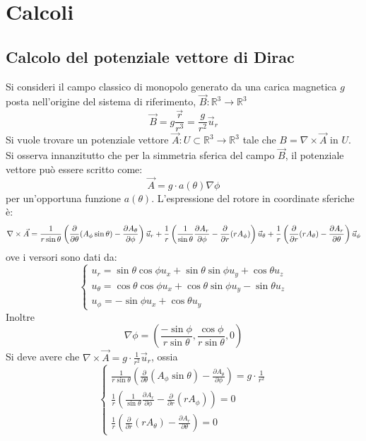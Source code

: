 \section{Calcoli}

\subsection{Calcolo del potenziale vettore di Dirac}
\label{sec:dirac_potential}
Si consideri il campo classico di monopolo generato da una carica magnetica $g$ posta
nell'origine del sistema di riferimento, $\vec B : \mathbb{R} ^3 \to \mathbb{R} ^3$
    $$ \vec B = g\frac{\vec r}{r^3} = \frac{g}{r^2} \vec u _r $$
Si vuole trovare un potenziale vettore $\vec A : U \subset \mathbb{R} ^3 \to \mathbb{R} ^3$ tale che
$ B = \nabla \times \vec A $ in $U$. Si osserva innanzitutto che per la simmetria
sferica del campo $\vec B$, il potenziale vettore può essere scritto come:
   $$ \vec A = g \cdot a(\theta) \nabla \phi $$
per un'opportuna funzione $a(\theta)$.
L'espressione del rotore in coordinate sferiche è:
$$
    \nabla \times \vec A =
         \frac{1}{r\sin\theta} \left(
              \frac{\partial}{\partial\theta}(A_\phi\sin\theta) -
              \frac{\partial A_\theta}{\partial\phi}
              \right) \vec u _r \\
         + \frac{1}{r} \left(
              \frac{1}{\sin\theta}\frac{\partial A_r}{\partial\phi} -
              \frac{\partial}{\partial r}(r A_\phi)
              \right)\vec u _\theta \\
         + \frac{1}{r} \left(
              \frac{\partial}{\partial r}(r A_\theta) - \frac{\partial A_r}{\partial\theta}
              \right)\vec u _\phi
$$
ove i versori sono dati da:
$$
\begin{cases}
    u_r = \sin\theta \cos\phi u_x + \sin\theta \sin\phi u_y + \cos\theta u_z\\
    u_\theta = \cos\theta \cos\phi u_x + \cos\theta \sin\phi u_y - \sin\theta u_z\\
    u_\phi = -\sin\phi u_x + \cos\theta u_y
\end{cases}
$$
Inoltre
$$
   \nabla \phi = \left( \frac{-\sin\phi}{r\sin\theta},\frac{\cos\phi}{r\sin\theta},0 \right)
$$
Si deve avere che $ \nabla \times \vec A = g \cdot \frac{1}{r^2} \vec u _r$,
ossia
$$
\begin{cases}
    \frac{1}{r\sin\theta} \left(
         \frac{\partial}{\partial\theta}(A_\phi\sin\theta) -
         \frac{\partial A_\theta}{\partial\phi}
         \right) = g \cdot \frac{1}{r^2} \\
    \frac{1}{r} \left(
         \frac{1}{\sin\theta}\frac{\partial A_r}{\partial\phi} -
         \frac{\partial}{\partial r}(r A_\phi)
         \right) = 0 \\
    \frac{1}{r} \left(
         \frac{\partial}{\partial r}(r A_\theta) - \frac{\partial A_r}{\partial\theta}
         \right) = 0
\end{cases}
$$
